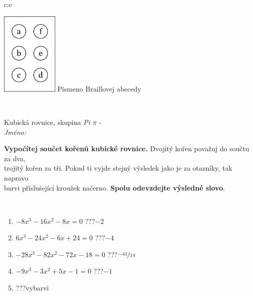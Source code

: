 \documentclass[10pt]{report}
\begin{document}
\begin{tabular}{c:c}
\begin{minipage}[c][104.5mm][t]{0.5\linewidth}
\begin{center}
\begin{minipage}{0.20\linewidth}
\begin{center}
\includegraphics[height=40mm]{../images/braille.png}
{\small Písmeno Braillovej abecedy}
\end{center}
\end{minipage}
\end{center}
\end{minipage}
\\ \hdashline
\begin{minipage}[c][104.5mm][t]{0.5\linewidth}
\begin{center}
\vspace{7mm}
{\huge Kubická rovnice, skupina \textit{Pi $\pi$} -}\\[5mm]
\textit{Jméno:}\phantom{xxxxxxxxxxxxxxxxxxxxxxxxxxxxxxxxxxxxxxxxxxxxxxxxxxxxxxxxxxxxxxxxx}\\[5mm]
\begin{minipage}{0.95\linewidth}
\begin{center}
\textbf{Vypočítej součet kořenů kubické rovnice.} Dvojitý kořen považuj do součtu za dva,\\trojitý kořen za tři. Pokud ti vyjde stejný výsledek jako je za otazníky, tak napravo\\barvi příslušející kroužek načerno. \textbf{Spolu odevzdejte výsledné slovo}.
\end{center}
\end{minipage}
\\[1mm]
\begin{minipage}{0.79\linewidth}
\begin{center}
\begin{varwidth}{\linewidth}
\begin{enumerate}
\Large
\item $-8x^3-16x^2-8x=0$\quad \dotfill\; ???\;\dotfill \quad $-2$
\item $6x^3-24x^2-6x+24=0$\quad \dotfill\; ???\;\dotfill \quad $-4$
\item $-28x^3-82x^2-72x-18=0$\quad \dotfill\; ???\;\dotfill \quad $\nicefrac{-41}{14}$
\item $-9x^3-3x^2+5x-1=0$\quad \dotfill\; ???\;\dotfill \quad $-1$
\item \quad \dotfill\; ???\;\dotfill \quad vybarvi

\end{enumerate}
\end{varwidth}
\end{center}
\end{minipage}
\end{center}
\end{minipage}
\end{tabular}
\end{document}
